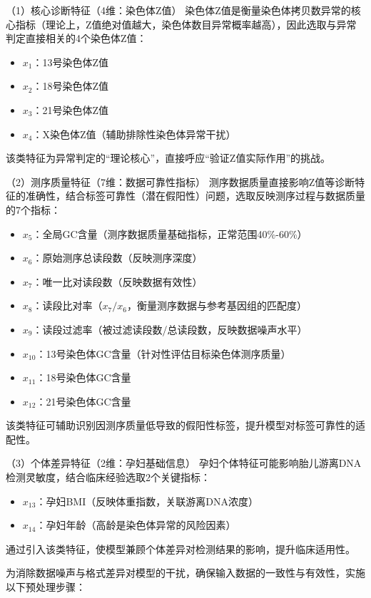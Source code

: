 \documentclass[withoutpreface,bwprint]{cumcmthesis} %
\begin{document}
（1）核心诊断特征（4维：染色体Z值）  
染色体Z值是衡量染色体拷贝数异常的核心指标（理论上，Z值绝对值越大，染色体数目异常概率越高），因此选取与异常判定直接相关的4个染色体Z值：  
\begin{itemize}
    \item \quad $ x_1 $：13号染色体Z值  
    \item \quad $ x_2 $：18号染色体Z值  
    \item \quad $ x_3 $：21号染色体Z值  
    \item \quad $ x_4 $：X染色体Z值（辅助排除性染色体异常干扰）  
\end{itemize}

该类特征为异常判定的“理论核心”，直接呼应“验证Z值实际作用”的挑战。

（2）测序质量特征（7维：数据可靠性指标）  
测序数据质量直接影响Z值等诊断特征的准确性，结合标签可靠性（潜在假阳性）问题，选取反映测序过程与数据质量的7个指标：  
\begin{itemize}
    \item $ x_5 $：全局GC含量（测序数据质量基础指标，正常范围40\%-60\%）
    \item $ x_6 $：原始测序总读段数（反映测序深度）
    \item $ x_7 $：唯一比对读段数（反映数据有效性）
    \item $ x_8 $：读段比对率（$ x_7/x_6 $，衡量测序数据与参考基因组的匹配度）
    \item $ x_9 $：读段过滤率（被过滤读段数/总读段数，反映数据噪声水平）
    \item $ x_{10} $：13号染色体GC含量（针对性评估目标染色体测序质量）
    \item $ x_{11} $：18号染色体GC含量
    \item $ x_{12} $：21号染色体GC含量
\end{itemize}
  
该类特征可辅助识别因测序质量低导致的假阳性标签，提升模型对标签可靠性的适配性。

（3）个体差异特征（2维：孕妇基础信息）  
孕妇个体特征可能影响胎儿游离DNA检测灵敏度，结合临床经验选取2个关键指标：  
\begin{itemize}
    \item $ x_{13} $：孕妇BMI（反映体重指数，关联游离DNA浓度）
    \item $ x_{14} $：孕妇年龄（高龄是染色体异常的风险因素）
\end{itemize}

通过引入该类特征，使模型兼顾个体差异对检测结果的影响，提升临床适用性。

为消除数据噪声与格式差异对模型的干扰，确保输入数据的一致性与有效性，实施以下预处理步骤：  
\end{document}
